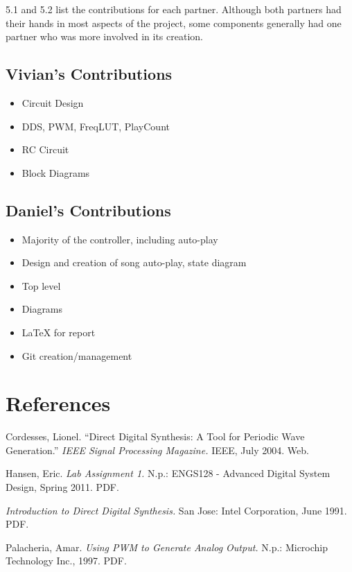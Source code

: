 \documentclass{article}
\begin{document}
  5.1 and 5.2 list the contributions for each partner. Although both partners had their hands in most aspects of the project, some components generally had one partner who was more involved in its creation.

  \subsection{Vivian's Contributions}
    \begin{itemize}
      \item Circuit Design
      \item DDS, PWM, FreqLUT, PlayCount
      \item RC Circuit
      \item Block Diagrams
    \end{itemize}

  \subsection{Daniel's Contributions}
    \begin{itemize}
      \item Majority of the controller, including auto-play
      \item Design and creation of song auto-play, state diagram
      \item Top level
      \item Diagrams
      \item LaTeX for report
      \item Git creation/management
    \end{itemize}

\section{References}


  \begin{thebibliography}{9}

  	Cordesses, Lionel.
  	``Direct Digital Synthesis: A Tool for Periodic Wave Generation.''
  	\emph{IEEE Signal Processing Magazine.}
  	IEEE,
  	July 2004. 
  	Web.  	

  	Hansen, Eric.
  	\emph{Lab Assignment 1.}
  	N.p.:
  	ENGS128 - Advanced Digital System Design, Spring 2011.
  	PDF.

  	\emph{Introduction to Direct Digital Synthesis.}
  	San Jose: Intel Corporation,
  	June 1991.
  	PDF.

  	Palacheria, Amar.
  	\emph{Using PWM to Generate Analog Output.}
  	N.p.: Microchip Technology Inc.,
  	1997.
  	PDF.

  \end{thebibliography}
\end{document}
